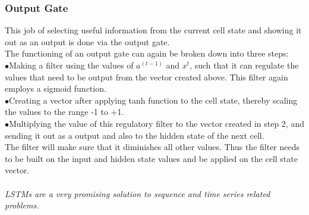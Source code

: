   \subsubsection{Output Gate}
  This job of selecting useful information from the current cell state and showing it out as an output is done via the output gate.\\The functioning of an output gate can again be broken down into three steps:\\
\indent$\bullet$\hspace{5pt}Making a filter using the values of $a^{(t-1)}$ and $x^t$, such that it can regulate the values that need to be output from the vector created above. This filter again employs a sigmoid function.\\
\indent$\bullet$\hspace{5pt}Creating a vector after applying tanh function to the cell state, thereby scaling the values to the range -1 to +1.\\
\indent$\bullet$\hspace{5pt}Multiplying the value of this regulatory filter to the vector created in step 2, and sending it out as a output and also to the hidden state of the next cell.\\
The filter will make sure that it diminishes all other values. Thus the filter needs to be built on the input and hidden state values and be applied on the cell state vector.\\\\
\textit{LSTMs are a very promising solution to sequence and time series related problems.}